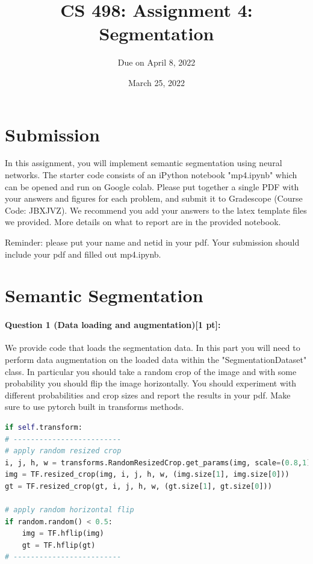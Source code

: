 \documentclass[11pt]{article}
\begin{document}
\author{Due on April 8, 2022}
\title{CS 498: Assignment 4: Segmentation}
\date{March 25, 2022}
\maketitle

\medskip


\section*{Submission}
In this assignment, you will implement semantic segmentation using neural networks. The starter code consists of an iPython notebook "mp4.ipynb" which can be opened and run on Google colab. Please put together a single PDF with your answers and figures for each problem, and submit it to Gradescope (Course Code: JBXJVZ). 
We recommend you add your answers to the latex template files we provided. More details on what to report are in the provided notebook. 

Reminder: please put your name and netid in your pdf.
Your submission should include your pdf and filled out mp4.ipynb.

\section*{Semantic Segmentation} 

\paragraph{Question 1 (Data loading and augmentation)[1 pt]:}
We provide code that loads the segmentation data. In this part you will need to perform data augmentation on the loaded data within the "SegmentationDataset" class. In particular you should take a random crop of the image and with some probability you should flip the image horizontally. You should experiment with different probabilities and crop sizes and report the results in your pdf. Make sure to use pytorch built in transforms methods.

\begin{lstlisting}[language=Python, basicstyle=\scriptsize]
if self.transform:
# -------------------------
# apply random resized crop
i, j, h, w = transforms.RandomResizedCrop.get_params(img, scale=(0.8,1), ratio=(3/4,4/3))
img = TF.resized_crop(img, i, j, h, w, (img.size[1], img.size[0]))
gt = TF.resized_crop(gt, i, j, h, w, (gt.size[1], gt.size[0]))

# apply random horizontal flip
if random.random() < 0.5:
    img = TF.hflip(img)
    gt = TF.hflip(gt)
# -------------------------
\end{lstlisting}
\end{document}
